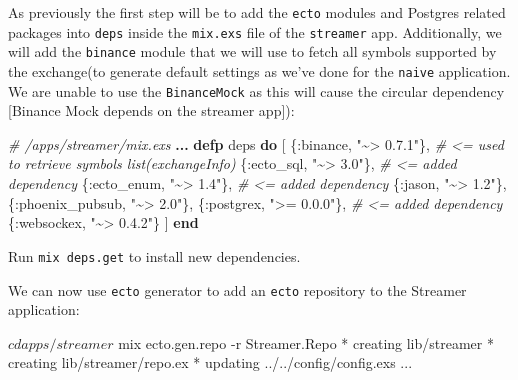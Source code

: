 \documentclass[
  oneside]{book}
\newenvironment{Shaded}{\begin{snugshade}}{\end{snugshade}}
\newcommand{\AttributeTok}[1]{\textcolor[rgb]{0.77,0.63,0.00}{#1}}
\newcommand{\CommentTok}[1]{\textcolor[rgb]{0.56,0.35,0.01}{\textit{#1}}}
\newcommand{\ExtensionTok}[1]{#1}
\newcommand{\KeywordTok}[1]{\textcolor[rgb]{0.13,0.29,0.53}{\textbf{#1}}}
\newcommand{\NormalTok}[1]{#1}
\newcommand{\OperatorTok}[1]{\textcolor[rgb]{0.81,0.36,0.00}{\textbf{#1}}}
\newcommand{\StringTok}[1]{\textcolor[rgb]{0.31,0.60,0.02}{#1}}
\newcommand{\VariableTok}[1]{\textcolor[rgb]{0.00,0.00,0.00}{#1}}
\begin{document}
As previously the first step will be to add the \texttt{ecto} modules and Postgres related packages into \texttt{deps} inside the \texttt{mix.exs} file of the \texttt{streamer} app. Additionally, we will add the \texttt{binance} module that we will use to fetch all symbols supported by the exchange(to generate default settings as we've done for the \texttt{naive} application. We are unable to use the \texttt{BinanceMock} as this will cause the circular dependency {[}Binance Mock depends on the streamer app{]}):

\begin{Shaded}
\begin{Highlighting}[]
  \CommentTok{\# /apps/streamer/mix.exs}
  \OperatorTok{...}
  \KeywordTok{defp}\NormalTok{ deps }\KeywordTok{do}
\NormalTok{    [}
\NormalTok{      \{}\VariableTok{:binance}\NormalTok{, }\StringTok{"\textasciitilde{}\textgreater{} 0.7.1"}\NormalTok{\}, }\CommentTok{\# \textless{}= used to retrieve symbols list(exchangeInfo)}
\NormalTok{      \{}\VariableTok{:ecto\_sql}\NormalTok{, }\StringTok{"\textasciitilde{}\textgreater{} 3.0"}\NormalTok{\},  }\CommentTok{\# \textless{}= added dependency}
\NormalTok{      \{}\VariableTok{:ecto\_enum}\NormalTok{, }\StringTok{"\textasciitilde{}\textgreater{} 1.4"}\NormalTok{\}, }\CommentTok{\# \textless{}= added dependency}
\NormalTok{      \{}\VariableTok{:jason}\NormalTok{, }\StringTok{"\textasciitilde{}\textgreater{} 1.2"}\NormalTok{\},}
\NormalTok{      \{}\VariableTok{:phoenix\_pubsub}\NormalTok{, }\StringTok{"\textasciitilde{}\textgreater{} 2.0"}\NormalTok{\},}
\NormalTok{      \{}\VariableTok{:postgrex}\NormalTok{, }\StringTok{"\textgreater{}= 0.0.0"}\NormalTok{\}, }\CommentTok{\# \textless{}= added dependency}
\NormalTok{      \{}\VariableTok{:websockex}\NormalTok{, }\StringTok{"\textasciitilde{}\textgreater{} 0.4.2"}\NormalTok{\}}
\NormalTok{    ]}
  \KeywordTok{end}
\end{Highlighting}
\end{Shaded}

Run \texttt{mix\ deps.get} to install new dependencies.

We can now use \texttt{ecto} generator to add an \texttt{ecto} repository to the Streamer application:

\begin{Shaded}
\begin{Highlighting}[]
\ExtensionTok{$}\NormalTok{ cd apps/streamer}
\ExtensionTok{$}\NormalTok{ mix ecto.gen.repo }\AttributeTok{{-}r}\NormalTok{ Streamer.Repo}
\ExtensionTok{*}\NormalTok{ creating lib/streamer}
\ExtensionTok{*}\NormalTok{ creating lib/streamer/repo.ex}
\ExtensionTok{*}\NormalTok{ updating ../../config/config.exs}
\ExtensionTok{...}
\end{Highlighting}
\end{Shaded}
\end{document}
